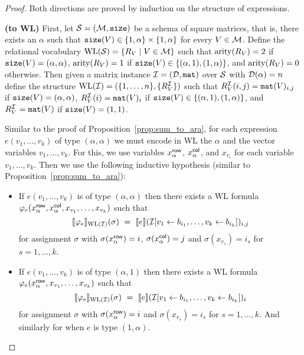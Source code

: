 
\begin{proof}
Both directions are proved by induction on the structure of expressions.

\smallskip

\noindent \textbf{(\langprod to WL)} First, let $\mathcal{S}=(\mathcal{M},\texttt{size})$ be a schema of square matrices, that is, there exists an $\alpha$ such 
that $\texttt{size}(V) \in \{1, \alpha\} \times \{1,\alpha\}$ for every $V \in \mathcal{M}$.
Define the relational vocabulary $\text{WL}(\mathcal{S}) = \{R_V \mid V \in \mathcal{M}\}$ such that $\operatorname{arity}(R_V) = 2$ 
if $\texttt{size}(V) = (\alpha, \alpha)$, $\operatorname{arity}(R_V) = 1$ if $\texttt{size}(V) \in \{(\alpha,1), (1,\alpha)\}$, and 
$\operatorname{arity}(R_V) = 0$ otherwise.
Then given a matrix instance $\mathcal{I} = (\mathcal{D},\texttt{mat})$ over $\mathcal{S}$ with  $\mathcal{D}(\alpha) = n$ define the structure 
$\text{WL}(\mathcal{I}) = (\{1, \ldots, n\}, \{R_V^{\mathcal{I}}\} )$ such that 
$R_V^{\mathcal{I}}(i, j) = \texttt{mat}(V)_{i,j}$ if $\texttt{size}(V) = (\alpha, \alpha)$, $R_V^{\mathcal{I}}(i) = \texttt{mat}(V)_{i}$ 
if $\texttt{size}(V) \in \{(\alpha,1), (1,\alpha)\}$, and $R_V^{\mathcal{I}} = \texttt{mat}(V)$ if $\texttt{size}(V) = (1,1)$.

Similar to the proof of Proposition~\ref{prop:sum_to_ara}, for each expression $e(v_1, \ldots, v_k)$ of type $(\alpha, \alpha)$ we must encode in WL the $\alpha$ and the vector variables $v_1, \ldots, v_k$. For this, we use variables $x_{\alpha}^{\mathsf{row}}$, $x_{\alpha}^{\mathsf{col}}$, and $x_{v_i}$ for each variable $v_1, \ldots, v_k$. Then we use the following inductive hypothesis (similar to Proposition~\ref{prop:sum_to_ara}):

\newcommand{\varphie}{\varphi_e}
\newcommand{\xr}{x_{\alpha}^\row}
\newcommand{\xc}{x_{\alpha}^\col}

\begin{itemize}
	\item If $e(v_1,\ldots,v_k)$ is of type $(\alpha,\alpha)$ then there exists a WL formula $\varphie(x_{\alpha}^\row,x_{\alpha}^\col, x_{v_1}, \ldots, x_{v_k})$ such that
	$$
	\ssem{\varphie}{\text{WL}(\I)}(\sigma) \ = \ \sem{e}{\I[v_1\gets b_{i_1},\ldots,v_k\gets b_{i_k}]}_{i,j}
	$$
	for assignment $\sigma$ with $\sigma(\xr)=i$, $\sigma(\xc)=j$ and $\sigma(x_{v_s})=i_s$ for $s=1,\ldots, k$.
	
	\item If $e(v_1,\ldots,v_k)$ is of type $(\alpha,1)$ then there exists a WL formula $\varphie(x_{\alpha}^\row, x_{v_1}, \ldots, x_{v_k})$ such that
	$$
	\ssem{\varphie}{\text{WL}(\I)}(\sigma) \ = \ \sem{e}{\I[v_1\gets b_{i_1},\ldots,v_k\gets b_{i_k}]}_{i}
	$$
	for assignment $\sigma$ with $\sigma(\xr)=i$ and $\sigma(x_{v_s})=i_s$ for $s=1,\ldots, k$.
	And similarly for when $e$ is type $(1,\alpha)$.
	

\end{itemize}
\end{proof}
